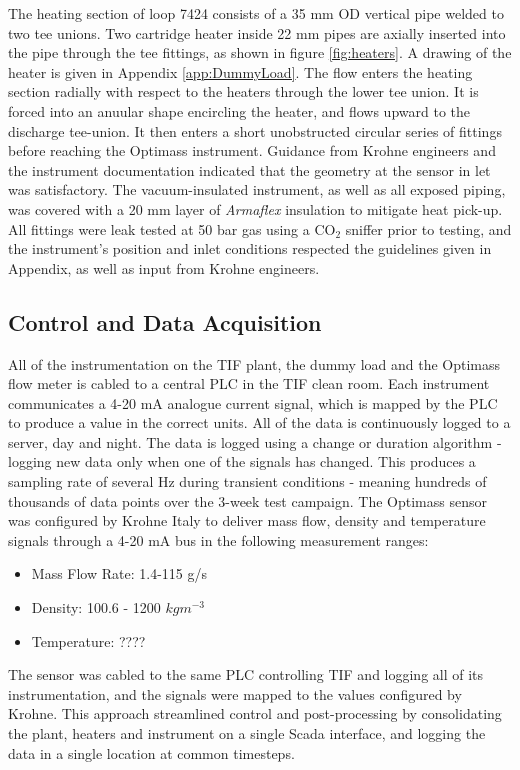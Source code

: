 \documentclass{report}
\begin{document}
The heating section of loop 7424 consists of a 35 mm OD vertical pipe welded to two tee unions. Two cartridge heater inside 22 mm pipes are axially inserted into the pipe through the tee fittings, as shown in figure \ref{fig:heaters}. A drawing of the heater is given in Appendix \ref{app:DummyLoad}. The flow enters the heating section radially with respect to the heaters through the lower tee union. It is forced into an anuular shape encircling the heater, and flows upward to the discharge tee-union. It then enters a short unobstructed circular series of fittings before reaching the Optimass instrument. Guidance from Krohne engineers and the instrument documentation indicated that the geometry at the sensor in let was satisfactory.
The vacuum-insulated instrument, as well as all exposed piping, was covered with a 20 mm layer of \textit{Armaflex} insulation to mitigate heat pick-up. All fittings were leak tested at 50 bar gas using a CO$_2$ sniffer prior to testing, and the instrument's position and inlet conditions respected the guidelines given in Appendix, as well as input from Krohne engineers. 

\subsection{Control and Data Acquisition}
All of the instrumentation on the TIF plant, the dummy load and the Optimass flow meter is cabled to a central PLC in the TIF clean room. Each instrument communicates a 4-20 mA analogue current signal, which is mapped by the PLC to produce a value in the correct units. All of the data is continuously logged to a server, day and night. The data is logged using a change or duration algorithm - logging new data only when one of the signals has changed. This produces a sampling rate of several Hz during transient conditions - meaning hundreds of thousands of data points over the 3-week test campaign.
The Optimass sensor was configured by Krohne Italy to deliver mass flow, density and temperature signals through a 4-20 mA bus in the following measurement ranges:\\
\begin{itemize}
\item{Mass Flow Rate: 1.4-115 g/s} %
\item{Density: 100.6 - 1200 $kgm^{-3}$}%
\item{Temperature: ????}
\end{itemize}
The sensor was cabled to the same PLC controlling TIF and logging all of its instrumentation, and the signals were mapped to the values configured by Krohne. This approach streamlined control and post-processing by consolidating the plant, heaters and instrument on a single Scada interface, and logging the data in a single location at common timesteps. 
\end{document}
